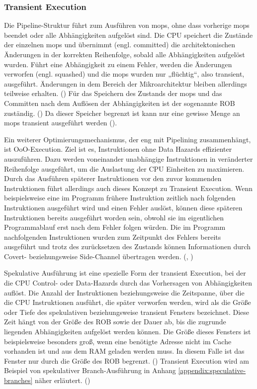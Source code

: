 \subsubsection{Transient Execution}
Die Pipeline-Struktur führt zum Ausführen
von \acp{mop}, ohne dass vorherige \acp{mop} beendet oder
alle Abhängigkeiten aufgelöst sind. Die \ac{CPU} speichert die
Zustände der einzelnen \acp{mop} und übernimmt (engl. committed)
die architektonischen Änderungen in der korrekten Reihenfolge,
sobald alle Abhängigkeiten aufgelöst wurden. Führt eine
Abhängigkeit zu einem Fehler, werden die Änderungen verworfen
(engl. squashed) und die \acp{mop} wurden nur „flüchtig“,
also transient, ausgeführt. Änderungen in dem Bereich der
Mikroarchitektur bleiben allerdings teilweise erhalten.
(\cite[251]{canella_systematic_2019})
Für das Speichern des Zustands der \acp{mop} und das Committen
nach dem Auflösen der Abhängigkeiten ist der sogenannte \ac{ROB}
zuständig. (\cite[493,494]{sarangi_basic_2021})
Da dieser Speicher begrenzt ist kann nur eine gewisse
Menge an \acp{mop} transient ausgeführt werden
(\cite[6]{mosier_analyzing_2025}).

Ein weiterer Optimierungsmechanismus, der eng mit Pipelining
zusammenhängt, ist \ac{OoO}-Execution. Ziel ist es,
Instruktionen ohne Data Hazards effizienter auszuführen.
Dazu werden voneinander unabhängige Instruktionen in
veränderter Reihenfolge ausgeführt, um die Auslastung der
\ac{CPU} Einheiten zu maximieren. Durch das Ausführen späterer
Instruktionen vor den zuvor kommenden Instruktionen führt
allerdings auch dieses Konzept zu Transient Execution.
Wenn beispielsweise eine im Programm frühere Instruktion
zeitlich nach folgenden Instruktionen ausgeführt wird und einen
Fehler auslöst, können diese späteren Instruktionen bereits
ausgeführt worden sein, obwohl sie im eigentlichen
Programmablauf erst nach dem Fehler folgen würden.
Die im Programm nachfolgenden Instruktionen wurden zum Zeitpunkt
des Fehlers bereits ausgeführt und trotz des zurücksetzen des
Zustands können Informationen durch Covert- beziehungsweise
Side-Channel übertragen werden.
(\cite[5]{lipp_meltdown_2020}, \cite[633]{cheng_speclfb_2024})

Spekulative Ausführung ist eine spezielle Form der transient
Execution, bei der die \ac{CPU} Control- oder Data-Hazards durch das
Vorhersagen von Abhängigkeiten auflöst.
Die Anzahl der Instruktionen beziehungsweise die Zeitspanne, über
die die \ac{CPU} Instruktionen ausführt, die später verworfen
werden, wird als die Größe oder Tiefe des spekulativen
beziehungsweise transient Fensters bezeichnet. Diese Zeit hängt
von der Größe des \ac{ROB} sowie der Dauer ab, bis die zugrunde
liegenden Abhängigkeiten aufgelöst werden können. Die Größe
dieses Fensters ist beispielsweise besonders groß, wenn eine
benötigte Adresse nicht im Cache vorhanden ist und aus dem \ac{RAM}
geladen werden muss. In diesem Falle ist das Fenster nur durch
die Größe des \ac{ROB} begrenzt. (\cite[6]{mosier_analyzing_2025})
Transient Execution wird am Beispiel von spekulativer
Branch-Ausführung in Anhang
\ref{appendix:speculative-branches} näher erläutert.
(\cite[136]{kaeli_speculative_2005})
